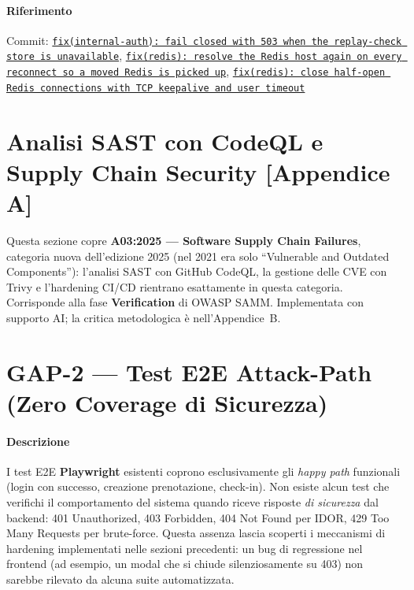 ﻿\documentclass[a4paper,12pt]{report}
\newcommand{\commitref}[2]{\texttt{\small \href{https://github.com/diegoandruccioli/hotel-pms/commit/#1}{#2}}}
\begin{document}
\paragraph{Riferimento} Commit: \commitref{e633a72e}{fix(internal-auth): fail closed with 503 when the replay-check store is unavailable}, \commitref{4eef1747}{fix(redis): resolve the Redis host again on every reconnect so a moved Redis is picked up}, \commitref{f62d9081}{fix(redis): close half-open Redis connections with TCP keepalive and user timeout}

\section{Analisi SAST con CodeQL e Supply Chain Security \textnormal{\small\textcolor{warnyellow}{[Appendice A]}}}

\begin{notebox}[title={Nota --- A03:2025 Software Supply Chain Failures + OWASP SAMM Verification (AI-assisted)}]
Questa sezione copre \textbf{A03:2025 --- Software Supply Chain Failures}, categoria nuova
dell'edizione 2025 (nel 2021 era solo ``Vulnerable and Outdated Components''): l'analisi
SAST con GitHub CodeQL, la gestione delle CVE con Trivy e l'hardening CI/CD rientrano
esattamente in questa categoria. Corrisponde alla fase \textbf{Verification} di OWASP SAMM.
Implementata con supporto AI; la critica metodologica è nell'Appendice~B.
\end{notebox}

\section{GAP-2 --- Test E2E Attack-Path (Zero Coverage di Sicurezza)}

\paragraph{Descrizione}
I test E2E \textbf{Playwright} esistenti coprono esclusivamente gli
\emph{happy path} funzionali (login con successo, creazione prenotazione,
check-in). Non esiste alcun test che verifichi il comportamento del sistema
quando riceve risposte \emph{di sicurezza} dal backend: 401 Unauthorized, 403
Forbidden, 404 Not Found per IDOR, 429 Too Many Requests per brute-force.
Questa assenza lascia scoperti i meccanismi di hardening implementati nelle
sezioni precedenti: un bug di regressione nel frontend (ad esempio, un modal
che si chiude silenziosamente su 403) non sarebbe rilevato da alcuna suite
automatizzata.
\end{document}
